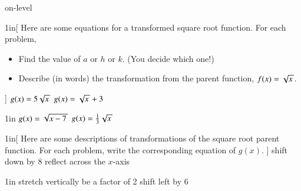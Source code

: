 \begin{taggedblock}{on-level}

\begin{my2Problems}[\normalsize]{1in}[%
    Here are some equations for a transformed square root function.
    For each problem,
    \vspace{-1em}
    \begin{itemize}[nosep]
        \item Find the value of $a$ or $h$ or $k$. (You decide which one!)
        \item Describe (in words) the transformation from the parent function, $f(x)=\myRoot{x}$.
    \end{itemize}
    ]
    {
        $g(x) = 5 \myRoot{x}$
    }
    {
        $g(x) = \myRoot{x} + 3$
    }
\end{my2Problems}
\begin{my2Problems}[\normalsize]{1in}
    {
        $g(x) = \myRoot{x-7}$
    }
    {
        $g(x) = \frac{1}{3}\myRoot{x}$
    }
\end{my2Problems}


\newpage
\begin{my2Problems}[\normalsize]{1in}[%
    Here are some descriptions of transformations of the square root parent function.
    For each problem, write the corresponding equation of $g(x)$.
    ]
    {
        shift down by 8
    }
    {
        reflect across the $x$-axis
    }
\end{my2Problems}
\begin{my2Problems}[\normalsize]{1in}
    {
        stretch vertically be a factor of 2
    }
    {
        shift left by 6
    }
\end{my2Problems}


\end{taggedblock}

